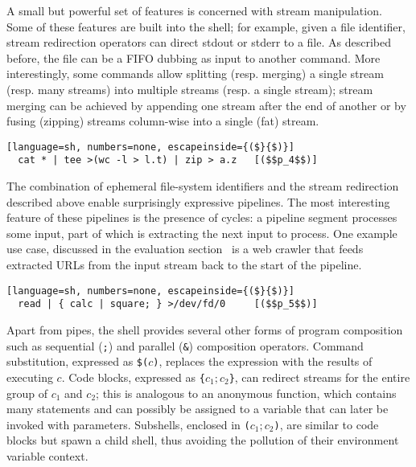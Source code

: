 \documentclass[sigplan,10pt,review,anonymous]{acmart}
\newcommand{\ttt}[1]{\texttt{\small #1}}
\begin{document}
A small but powerful set of features is concerned with stream manipulation.
Some of these features are built into the shell;
  for example, given a file identifier, stream redirection operators can direct stdout or stderr to a file.
As described before, the file can be a FIFO dubbing as input to another command.
More interestingly, some commands allow splitting (resp. merging) a single stream (resp. many streams) into multiple streams (resp. a single stream);
  stream merging can be achieved by appending one stream after the end of another or by fusing (zipping) streams column-wise into a single (fat) stream.

\smallskip
\begin{lstlisting}[language=sh, numbers=none, escapeinside={($}{$)}]
  cat * | tee >(wc -l > l.t) | zip > a.z   [($$p_4$$)]
\end{lstlisting}
\smallskip

\noindent
The combination of ephemeral file-system identifiers and the stream redirection described above enable surprisingly expressive pipelines. %
The most interesting feature of these pipelines is the presence of cycles:
  a pipeline segment processes some input, part of which is extracting the next input to process.
One example use case, discussed in the evaluation section~ is a web crawler that feeds extracted URLs from the input stream back to the start of the pipeline.

\smallskip
\begin{lstlisting}[language=sh, numbers=none, escapeinside={($}{$)}]
  read | { calc | square; } >/dev/fd/0     [($$p_5$$)]
\end{lstlisting}
\smallskip

\noindent
Apart from pipes, the \unix shell provides several other forms of program composition such as sequential (\ttt{;}) and parallel (\ttt{\&}) composition operators.
Command substitution, expressed as \ttt{\$($c$)}, replaces the expression with the results of executing $c$.
Code blocks, expressed as \ttt{\{$c_1; c_2$\}}, can redirect streams for the entire group of $c_1$ and $c_2$;
  this is analogous to an anonymous function, which contains many statements and can possibly be assigned to a variable that can later be invoked with parameters.
Subshells, enclosed in \ttt{($c_1; c_2$)}, are similar to code blocks but spawn a child shell, thus avoiding the pollution of their environment variable context. %
\end{document}
